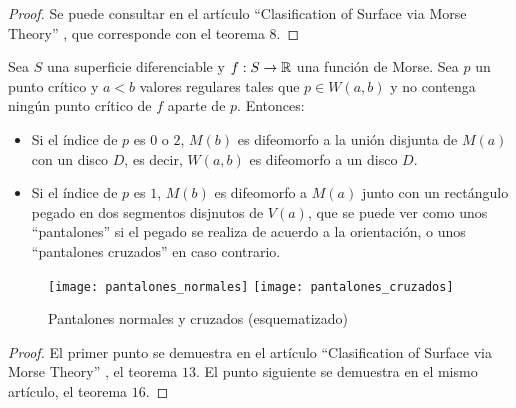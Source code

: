\begin{proof}
	Se puede consultar en el artículo ``Clasification of Surface via Morse Theory'' \cite{MorseTh1}, que corresponde con el teorema $8$.
\end{proof}

\begin{teorema}
	Sea $S$ una superficie diferenciable y $f: S \rightarrow \mathbb{R}$ una función de Morse. Sea $p$ un punto crítico y $a < b$ valores regulares tales que $p \in W(a,b)$ y no contenga ningún punto crítico de $f$ aparte de $p$. Entonces:
	\begin{itemize}
		\item Si el índice de $p$ es $0$ o $2$, $M(b)$ es difeomorfo a la unión disjunta de $M(a)$ con un disco $D$, es decir, $W(a,b)$ es difeomorfo a un disco $D$.
		\item Si el índice de $p$ es $1$, $M(b)$ es difeomorfo a $M(a)$ junto con un rectángulo pegado  en dos segmentos disjnutos de $V(a)$, que se puede ver como unos ``pantalones'' si el pegado se realiza de acuerdo a la orientación, o unos ``pantalones cruzados'' en caso contrario.
	\end{itemize}
\end{teorema}

\begin{figure}[h]
  	\centering
  	\texttt{[image: pantalones\_normales]}
  	\texttt{[image: pantalones\_cruzados]}
  	\caption{Pantalones normales y cruzados (esquematizado)}
  	\label{fig:pantalones}
\end{figure}

\begin{proof}
	El primer punto se demuestra en el artículo ``Clasification of Surface via Morse Theory'' \cite{MorseTh1}, el teorema $13$. El punto siguiente se demuestra en el mismo artículo, el teorema $16$.
\end{proof}

\endinput
